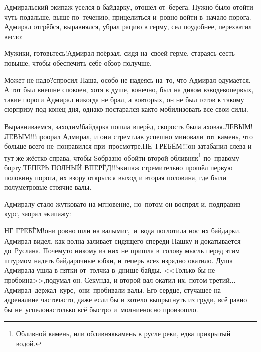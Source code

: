 Адмиральский экипаж уселся в байдарку, отошёл от~берега. Нужно было отойти чуть подальше, выше по~течению, прицелиться и~ровно войти в~начало порога. Адмирал отгрёбся, выравнялся, убрал рацию в герму, сел поудобнее, перехватил весло: 

\diagdash Мужики, готовьтесь!\mdash Адмирал поёрзал, сидя на~своей герме, стараясь сесть повыше, чтобы обеспечить себе обзор получше.

\diagdash Может не надо?\mdash спросил Паша, особо не надеясь на~то, что Адмирал одумается. А тот был внешне спокоен, хотя в душе, конечно, был на диком взводе\mdash во\sdash первых, такие пороги Адмирал никогда не брал, а во\sdash вторых, он не был готов к такому сюрпризу под конец дня, однако постарался как\sdash то мобилизовать все свои силы.

\renewcommand*{\thefootnote}{\fnsymbol{footnote}}
\setcounter{footnote}{0}
\diagdash Выравниваемся, заходим!\mdash байдарка пошла вперёд, скорость была аховая.\mdash ЛЕВЫМ! ЛЕВЫМ!!!\mdash проорал Адмирал, и они стремглав успешно миновали тот камень, что больше всего не~понравился при~просмотре.\mdash НЕ~ГРЕБЁМ!!!\mdash он затабанил слева и тут же жёстко справа, чтобы S\sdash образно обойти второй обливняк\footnote{Обливной камень, или обливняк\mdash камень в русле реки, едва прикрытый водой.} по~правому борту.\mdash ТЕПЕРЬ ПОЛНЫЙ ВПЕРЁД!!!\mdash экипаж стремительно прошёл первую половину порога, их взору открылся выход и вторая половина, где были полуметровые стоячие валы. 

Адмиралу стало жутковато на мгновение, но~потом он воспрял и, подправив курс, заорал экипажу:

\diagdash НЕ ГРЕБЁМ!\mdash они ровно шли на валы\mdash миг,~и~вода поглотила нос их байдарки. Адмирал видел, как волна заливает сидящего спереди Пашку и докатывается до~Руслана. Почему\sdash то никому из них не пришла в~голову мысль перед этим штурмом надеть байдарочные юбки, и теперь всех изрядно окатило. Душа Адмирала ушла в пятки от~толчка в~днище байды. <<Только бы не пробоина>>,\mdash подумал он. Секунда, и второй вал окатил их, потом третий$\ldots$ Адмирал~держал~курс,~они~пробивали валы. Его сердце, стучащее на адреналине часто\sdash часто, даже если бы и хотело выпрыгнуть из груди, всё равно бы не~успело\mdash настолько всё быстро и~молниеносно произошло. 


